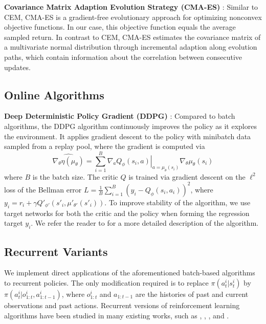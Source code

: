 \documentclass{article}
\begin{document}
{\bf Covariance Matrix Adaption Evolution Strategy (CMA-ES)} \cite{Hansen2001CMAES}: Similar to CEM, CMA-ES is a gradient-free evolutionary approach for optimizing nonconvex objective functions. In our case, this objective function equals the average sampled return. In contrast to CEM, CMA-ES estimates the covariance matrix of a multivariate normal distribution through incremental adaption along evolution paths, which contain information about the correlation between consecutive updates.

\subsection{Online Algorithms}

{\bf Deep Deterministic Policy Gradient (DDPG)}  \cite{Lillicrap15}: Compared to batch algorithms, the DDPG algorithm continuously improves the policy as it explores the environment. It applies gradient descent to the policy with minibatch data sampled from a replay pool, where the gradient is computed via
\[\widehat{\nabla_\theta \eta(\mu_\theta)} = \sum_{i=1}^B \left.\nabla_a Q_\phi(s_i, a)\right|_{a=\mu_\theta(s_i)} \nabla_\theta \mu_\theta(s_i)\]
where $B$ is the batch size. The critic $Q$ is trained via gradient descent on the $\ell^2$ loss of the Bellman error $L = \frac{1}{B}\sum_{i=1}^B (y_i - Q_\phi(s_i,a_i))^2$, where $y_i = r_i + \gamma Q'_{\phi'}(s'_i, \mu'_{\theta'}(s'_i))$. To improve stability of the algorithm, we use target networks for both the critic and the policy when forming the regression target $y_i$. We refer the reader to \citet{Lillicrap15} for a more detailed description of the algorithm.

\subsection{Recurrent Variants}
We implement direct applications of the aforementioned batch-based algorithms to recurrent policies. The only modification required is to replace $\pi(a_t^i|s_t^i)$ by $\pi(a_t^i|o_{1:t}^i, a_{1:t-1}^i)$, where $o_{1:t}^i$ and $a_{1:t-1}$ are the histories of past and current observations and past actions. Recurrent versions of reinforcement learning algorithms have been studied in many existing works, such as \citet{bakker2001reinforcement}, \citet{schafer2005solving}, \citet{wierstra2007solving}, and \citet{heess2015memory}.
\end{document}
